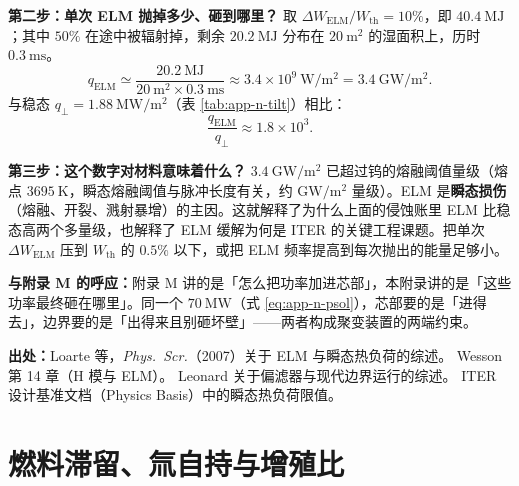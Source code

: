 \textbf{第二步：单次 ELM 抛掉多少、砸到哪里？} 取 $\Delta W_{\mathrm{ELM}}/W_{\mathrm{th}}=10\%$，即 $40.4\ \mathrm{MJ}$；其中 $50\%$ 在途中被辐射掉，剩余 $20.2\ \mathrm{MJ}$ 分布在 $20\ \mathrm{m^2}$ 的湿面积上，历时 $0.3\ \mathrm{ms}$。
\begin{equation}
q_{\mathrm{ELM}}\simeq\frac{20.2\ \mathrm{MJ}}{20\ \mathrm{m^2}\times0.3\ \mathrm{ms}}
\approx3.4\times10^{9}\ \mathrm{W/m^2}=3.4\ \mathrm{GW/m^2}.
\label{eq:app-n-qelm}
\end{equation}
与稳态 $q_\perp=1.88\ \mathrm{MW/m^2}$（表 \ref{tab:app-n-tilt}）相比：
\begin{equation}
\frac{q_{\mathrm{ELM}}}{q_\perp}\approx1.8\times10^{3}.
\end{equation}

\textbf{第三步：这个数字对材料意味着什么？} $3.4\ \mathrm{GW/m^2}$ 已超过钨的熔融阈值量级（熔点 $3695\ \mathrm{K}$，瞬态熔融阈值与脉冲长度有关，约 $\mathrm{GW/m^2}$ 量级）。ELM 是\textbf{瞬态损伤}（熔融、开裂、溅射暴增）的主因。这就解释了为什么上面的侵蚀账里 ELM 比稳态高两个多量级，也解释了 ELM 缓解为何是 ITER 的关键工程课题。把单次 $\Delta W_{\mathrm{ELM}}$ 压到 $W_{\mathrm{th}}$ 的 $0.5\%$ 以下，或把 ELM 频率提高到每次抛出的能量足够小。

\textbf{与附录 M 的呼应：}附录 M 讲的是「怎么把功率加进芯部」，本附录讲的是「这些功率最终砸在哪里」。同一个 $70\ \mathrm{MW}$（式 \eqref{eq:app-n-psol}），芯部要的是「进得去」，边界要的是「出得来且别砸坏壁」——两者构成聚变装置的两端约束。

{\footnotesize
\textbf{出处：}Loarte 等，\textit{Phys.\ Scr.}（2007）关于 ELM 与瞬态热负荷的综述。
Wesson 第 14 章（H 模与 ELM）。
Leonard 关于偏滤器与现代边界运行的综述。
ITER 设计基准文档（Physics Basis）中的瞬态热负荷限值。
}


\section{燃料滞留、氚自持与增殖比}

